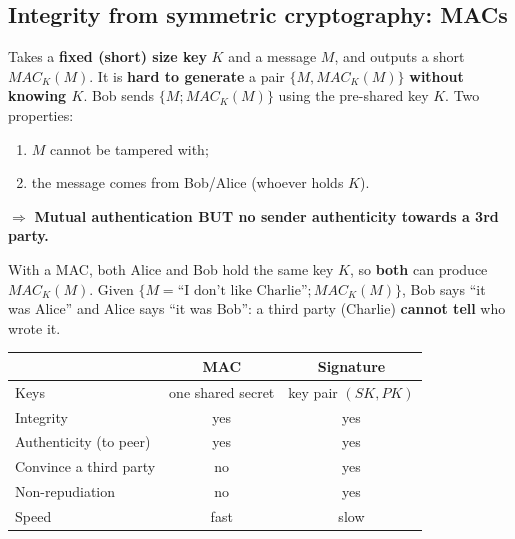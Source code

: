 \subsection{Integrity from symmetric cryptography: MACs}

\begin{defnbox}[title=Message Authentication Code (MAC)]
Takes a \textbf{fixed (short) size key} $K$ and a message $M$, and outputs a short
$MAC_K(M)$. It is \textbf{hard to generate} a pair $\{M, MAC_K(M)\}$ \textbf{without
knowing $K$}. Bob sends $\{M; MAC_K(M)\}$ using the pre-shared key $K$. Two properties:
\begin{enumerate}
  \item $M$ cannot be tampered with;
  \item the message comes from Bob/Alice (whoever holds $K$).
\end{enumerate}
$\Rightarrow$ \textbf{Mutual authentication BUT no sender authenticity towards a 3rd
party.}
\end{defnbox}

\begin{defnbox}[title=Repudiation]
With a MAC, both Alice and Bob hold the same key $K$, so \textbf{both} can produce
$MAC_K(M)$. Given $\{M = \text{``I don't like Charlie''}; MAC_K(M)\}$, Bob says ``it was
Alice'' and Alice says ``it was Bob'': a third party (Charlie) \textbf{cannot tell} who
wrote it.
\end{defnbox}

\begin{keybox}[title=MAC vs.\ digital signature]
\begin{center}
\begin{tabular}{l|c|c}
                         & \textbf{MAC}       & \textbf{Signature}  \\ \hline
Keys                     & one shared secret  & key pair $(SK, PK)$ \\
Integrity                & yes                & yes                 \\
Authenticity (to peer)   & yes                & yes                 \\
Convince a third party   & no                 & yes                 \\
Non-repudiation          & no                 & yes                 \\
Speed                    & fast               & slow
\end{tabular}
\end{center}
\end{keybox}

